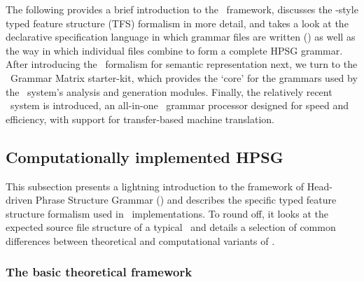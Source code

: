 The following provides a brief introduction to the \hpsg\ framework, discusses
the \delphin-style typed feature structure (TFS) formalism in more detail, and
takes a look at the declarative specification language in which grammar files
are written (\tdl) as well as the way in which individual files combine to form
a complete HPSG grammar. After introducing the \mrs\ formalism for semantic
representation next, we turn to the \lingo\ Grammar Matrix starter-kit, which
provides the `core' for the grammars used by the \depicto\ system's analysis
and generation modules. Finally, the relatively recent \ace\ system is
introduced, an all-in-one \delphin\ grammar processor designed for speed and
efficiency, with support for transfer-based machine translation.

\subsection{Computationally implemented HPSG}
\label{sub:HPSG}

This subsection presents a lightning introduction to the framework of
Head-driven Phrase Structure Grammar (\hpsg) \citep{pollard1994head} and
describes the specific typed feature structure formalism used in \delphin\
implementations. To round off, it looks at the expected source file structure
of a typical \delphin\ and details a selection of common differences between
theoretical and computational variants of \hpsg.

\subsubsection{The basic theoretical framework} %

